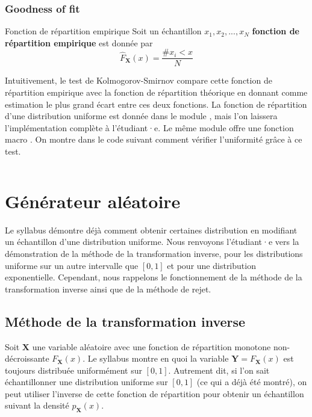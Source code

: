             \subsubsection{Goodness of fit}
                \begin{definition}{Fonction de répartition empirique}
                    Soit un échantillon $x_1, x_2, ..., x_N$ \textbf{fonction de répartition empirique} est donnée par
                    \begin{equation}
                        \hat{F}_{\mathbf{X}}(x) = \frac{\#x_i < x}{N}
                    \end{equation}
                \end{definition}

                Intuitivement, le test de Kolmogorov-Smirnov compare cette fonction de répartition empirique avec la fonction de répartition théorique en donnant comme estimation le plus grand écart entre ces deux fonctions. La fonction de répartition d'une distribution uniforme est donnée dans le module , mais l'on laissera l'implémentation complète à l'étudiant·e. Le même module offre une fonction macro . On montre dans le code suivant comment vérifier l'uniformité grâce à ce test.
                \inputminted{python}{codes/goodness_of_fit.py}
            
    \section{Générateur aléatoire}
        Le syllabus démontre déjà comment obtenir certaines distribution en modifiant un échantillon d'une distribution uniforme. Nous renvoyons l'étudiant·e vers la démonstration de la méthode de la transformation inverse, pour les distributions uniforme sur un autre intervalle que $[0, 1]$ et pour une distribution exponentielle. Cependant, nous rappelons le fonctionnement de la méthode de la transformation inverse ainsi que de la méthode de rejet.

        \subsection{Méthode de la transformation inverse}
            Soit $\mathbf{X}$ une variable aléatoire avec une fonction de répartition monotone non-décroissante $F_{\mathbf{X}}(x)$. Le syllabus montre en quoi la variable $\mathbf{Y} = F_{\mathbf{X}}(x)$ est toujours distribuée uniformément sur $[0, 1]$. Autrement dit, si l'on sait échantillonner une distribution uniforme sur $[0, 1]$ (ce qui a déjà été montré), on peut utiliser l'inverse de cette fonction de répartition pour obtenir un échantillon suivant la densité $p_{\mathbf{X}}(x)$.

